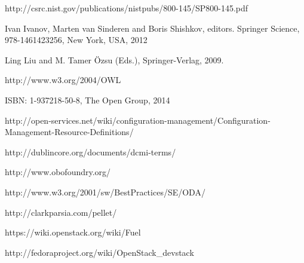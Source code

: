 




\newblock http://csrc.nist.gov/publications/nistpubs/800-145/SP800-145.pdf

Ivan Ivanov, Marten van Sinderen and Boris Shishkov, editors.
\newblock Springer Science, 978-1461423256, New York, USA, 2012


\newblock Ling Liu and M. Tamer Özsu (Eds.), Springer-Verlag, 2009.

\newblock http://www.w3.org/2004/OWL


\newblock ISBN:  1-937218-50-8, The Open Group, 2014

\newblock http://open-services.net/wiki/configuration-management/Configuration-Management-Resource-Definitions/

\newblock http://dublincore.org/documents/dcmi-terms/

\newblock http://www.obofoundry.org/

\newblock http://www.w3.org/2001/sw/BestPractices/SE/ODA/


\newblock http://clarkparsia.com/pellet/


\newblock https://wiki.openstack.org/wiki/Fuel

\newblock http://fedoraproject.org/wiki/OpenStack\_devstack

